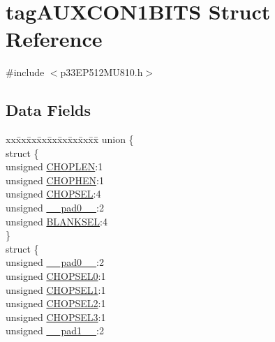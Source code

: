\hypertarget{structtag_a_u_x_c_o_n1_b_i_t_s}{}\section{tag\+A\+U\+X\+C\+O\+N1\+B\+I\+TS Struct Reference}
\label{structtag_a_u_x_c_o_n1_b_i_t_s}


{\ttfamily \#include $<$p33\+E\+P512\+M\+U810.\+h$>$}

\subsection*{Data Fields}
\begin{DoxyCompactItemize}
\item 
\begin{tabbing}
xx\=xx\=xx\=xx\=xx\=xx\=xx\=xx\=xx\=\kill
union \{\\
\>struct \{\\
\>\>unsigned \hyperlink{structtag_a_u_x_c_o_n1_b_i_t_s_a3ef61325b83d3685e2364392dd43dd06}{CHOPLEN}:1\\
\>\>unsigned \hyperlink{structtag_a_u_x_c_o_n1_b_i_t_s_a38243e11a4372e45b55166fcec4322fa}{CHOPHEN}:1\\
\>\>unsigned \hyperlink{structtag_a_u_x_c_o_n1_b_i_t_s_aafc704d0a50b4ba0c019d33514cb7782}{CHOPSEL}:4\\
\>\>unsigned \hyperlink{structtag_a_u_x_c_o_n1_b_i_t_s_adf71f3d8410c1f1dbbc96680a92c49af}{\_\_pad0\_\_}:2\\
\>\>unsigned \hyperlink{structtag_a_u_x_c_o_n1_b_i_t_s_a16dd126500ffc8232d3b8e619c4406a2}{BLANKSEL}:4\\
\>\} \\
\>struct \{\\
\>\>unsigned \hyperlink{structtag_a_u_x_c_o_n1_b_i_t_s_adf71f3d8410c1f1dbbc96680a92c49af}{\_\_pad0\_\_}:2\\
\>\>unsigned \hyperlink{structtag_a_u_x_c_o_n1_b_i_t_s_acc4daaf21ff4590b40d3f25dad388167}{CHOPSEL0}:1\\
\>\>unsigned \hyperlink{structtag_a_u_x_c_o_n1_b_i_t_s_a5be3cb702a6c27dd28ee2f7bb142c88c}{CHOPSEL1}:1\\
\>\>unsigned \hyperlink{structtag_a_u_x_c_o_n1_b_i_t_s_ae9a19a5d1e40ae671a2b05fa09e77c10}{CHOPSEL2}:1\\
\>\>unsigned \hyperlink{structtag_a_u_x_c_o_n1_b_i_t_s_a6bcb1f80b40842c9ebd3c9d76d4c196f}{CHOPSEL3}:1\\
\>\>unsigned \hyperlink{structtag_a_u_x_c_o_n1_b_i_t_s_acaf2d0924a107ec6e8d2e31febaf66f9}{\_\_pad1\_\_}:2\\

\end{tabbing}
\end{DoxyCompactItemize}
